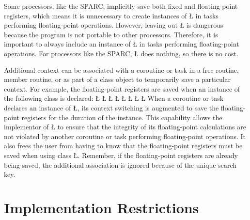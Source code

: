 \documentclass[openright,twoside]{report}
\begin{document}
\begin{annotation}
 Some processors, like the SPARC, implicitly save both fixed and floating-point registers, which means it is unnecessary to create instances of \LGinlinetrue\LGbegin\lgrinde\L{}\endlgrinde\LGend{} in tasks performing floating-point operations.
However, leaving out \LGinlinetrue\LGbegin\lgrinde\L{}\endlgrinde\LGend{} is dangerous because the program is not portable to other processors.
Therefore, it is important to always include an instance of \LGinlinetrue\LGbegin\lgrinde\L{}\endlgrinde\LGend{} in tasks performing floating-point operations.
For processors like the SPARC, \LGinlinetrue\LGbegin\lgrinde\L{}\endlgrinde\LGend{} does nothing, so there is no cost.
\end{annotation}

Additional context can be associated with a coroutine or task in a free routine, member routine, or as part of a class object to temporarily save a particular context.
For example, the floating-point registers are saved when an instance of the following class is declared:
\LGinlinefalse\LGbegin\lgrinde
\L{}
\L{}
\L{\LB{}}
\L{}
\L{\LB{}}
\L{\LB{}}
\CE{}\L{\LB{}}
\L{\LB{\};}}
\endlgrinde\LGend
When a coroutine or task declares an instance of \LGinlinetrue\LGbegin\lgrinde\L{}\endlgrinde\LGend{}, its context switching is augmented to save the floating-point registers for the duration of the instance.
This capability allows the implementor of \LGinlinetrue\LGbegin\lgrinde\L{}\endlgrinde\LGend{} to ensure that the integrity of its floating-point calculations are not violated by another coroutine or task performing floating-point operations.
It also frees the user from having to know that the floating-point registers must be saved when using class \LGinlinetrue\LGbegin\lgrinde\L{}\endlgrinde\LGend{}.
Remember, if the floating-point registers are already being saved, the additional association is ignored because of the unique search key.


\section{Implementation Restrictions}
\label{s:ImplementationRestrictions}
\end{document}
